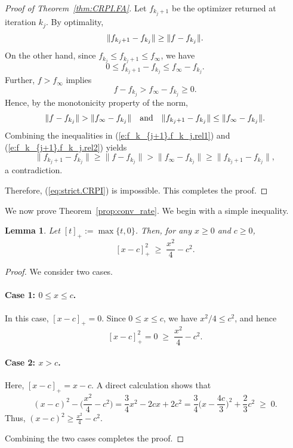 \documentclass[twoside]{article}
\theoremstyle{plain}
\newtheorem{lemma}[theorem]{Lemma}
\theoremstyle{definition}
\theoremstyle{remark}
\renewcommand{\eqref}[1]{(\ref{#1})}
\begin{document}
\begin{proof}[Proof of Theorem~\ref{thm:CRPI.FA}]
Let \(f_{k_j+1}\) be the optimizer returned at iteration \(k_j\). By optimality,
%
\begin{equation}
\label{e:f_k_{j+1}.f_k_j.rel1}
    \|f_{k_j+1} - f_{k_j}\| \ge \|f - f_{k_j}\|.
\end{equation}
%
On the other hand, since \(f_{k_j} \le f_{k_j+1} \le f_\infty\), we have
%
\[
    0 \le f_{k_j+1} - f_{k_j} \le f_\infty - f_{k_j}.
\]
%
Further, \(f > f_\infty\) implies
\[
    f - f_{k_j} > f_\infty - f_{k_j} \ge 0.
\]
%
Hence, by the monotonicity property of the norm, 
\begin{equation}
\label{e:f_k_{j+1}.f_k_j.rel2}
    \|f - f_{k_j}\| > \|f_\infty - f_{k_j}\|
    \quad\text{and}\quad
    \|f_{k_j+1} - f_{k_j}\| \le \|f_\infty - f_{k_j}\|.
\end{equation}
Combining the inequalities in \eqref{e:f_k_{j+1}.f_k_j.rel1} and \eqref{e:f_k_{j+1}.f_k_j.rel2} yields
\[
    \|f_{k_j+1} - f_{k_j}\|
    \ge
    \|f - f_{k_j}\|
    >
    \|f_\infty - f_{k_j}\|
    \ge
    \|f_{k_j+1} - f_{k_j}\|,
\]
a contradiction.

Therefore, \eqref{eq:strict.CRPI} is impossible. This completes the proof.
\end{proof}

We now prove Theorem~\ref{prop:conv_rate}. We begin with a simple inequality.

\begin{lemma}
\label{lem:relu_square}
Let $[t]_+ := \max\{t,0\}$. Then, for any $x \ge 0$ and $c \ge 0$,
\[
    [x-c]_+^2 \;\ge\; \frac{x^2}{4} - c^2.
\]
\end{lemma}

\begin{proof}
We consider two cases.

\paragraph{Case 1: $0 \leq x \le c$.}
In this case, $[x-c]_+ = 0$. Since $0 \leq x \le c$, we have $x^2/4 \le c^2$, and hence
\[
    [x-c]_+^2 = 0 \;\ge\; \frac{x^2}{4} - c^2.
\]

\paragraph{Case 2: $x > c$.}
Here, $[x-c]_+ = x-c$. A direct calculation shows that
\[
    (x-c)^2 - \Big(\frac{x^2}{4} - c^2\Big)
    = \frac{3}{4}x^2 - 2cx + 2c^2
    = \frac{3}{4}\Big(x - \frac{4c}{3}\Big)^2 + \frac{2}{3}c^2 \;\ge\; 0.
\]
Thus, $(x-c)^2 \ge \frac{x^2}{4} - c^2$.

Combining the two cases completes the proof.
\end{proof}
\end{document}
